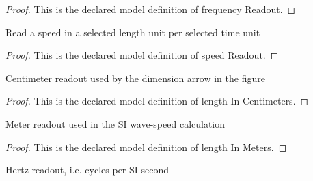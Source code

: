 \begin{proof}
  This is the declared model definition of frequency Readout.
\end{proof}
\begin{definition}
  \label{def:physics:phyx-mini-0179:phyxminiproblems-problemphyxmini0179-speedreadout}
  Read a speed in a selected length unit per selected time unit
\end{definition}
\begin{proof}
  This is the declared model definition of speed Readout.
\end{proof}
\begin{definition}
  \label{def:physics:phyx-mini-0179:phyxminiproblems-problemphyxmini0179-lengthincentimeters}
  Centimeter readout used by the dimension arrow in the figure
\end{definition}
\begin{proof}
  This is the declared model definition of length In Centimeters.
\end{proof}
\begin{definition}
  \label{def:physics:phyx-mini-0179:phyxminiproblems-problemphyxmini0179-lengthinmeters}
  Meter readout used in the SI wave-speed calculation
\end{definition}
\begin{proof}
  This is the declared model definition of length In Meters.
\end{proof}
\begin{definition}
  \label{def:physics:phyx-mini-0179:phyxminiproblems-problemphyxmini0179-frequencyinhertz}
  Hertz readout, i.e. cycles per SI second
\end{definition}
